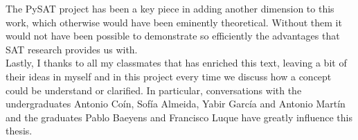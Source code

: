 \documentclass[
12pt, %
english, %
singlespacing, %
headsepline, %
]{MastersDoctoralThesis} %
\theoremstyle{definition}
\begin{document}
The PySAT project has been a key piece in adding another dimension to this work, which otherwise would have been eminently theoretical. Without them it would not have been possible to demonstrate so efficiently the advantages that SAT research provides us with. \\

Lastly, I thanks to all my classmates that has enriched this text, leaving a bit of their ideas in myself and in this project every time we discuss how a concept could be understand or clarified. In particular, conversations with the undergraduates Antonio Coín, Sofía Almeida, Yabir García and Antonio Martín  and the graduates Pablo Baeyens and Francisco Luque have greatly influence this thesis.\\


%
%


\medskip


\printbibliography
\end{document}
